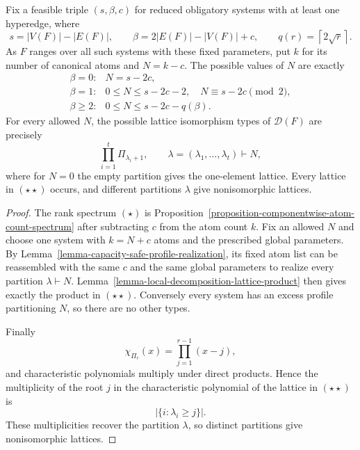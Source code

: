 \begin{corollary}
\label{corollary-factorization-lattice-spectrum}
Fix a feasible triple $(s,\beta,c)$ for reduced obligatory systems with at
least one hyperedge, where
\[
 s=|V(F)|-|E(F)|,
 \qquad
 \beta=2|E(F)|-|V(F)|+c,
 \qquad
 q(r)=\left\lceil2\sqrt r\right\rceil.
\]
As $F$ ranges over all such systems with these fixed parameters, put $k$ for
its number of canonical atoms and $N=k-c$.  The possible values of $N$ are
exactly
\[
\begin{array}{ll}
\beta=0:&N=s-2c,\\[1mm]
\beta=1:&0\le N\le s-2c-2,\quad N\equiv s-2c\pmod2,\\[1mm]
\beta\ge2:&0\le N\le s-2c-q(\beta).
\end{array}
\tag{\star}
\]
For every allowed $N$, the possible lattice isomorphism types of
$\mathcal D(F)$ are precisely
\[
 \prod_{i=1}^t\Pi_{\lambda_i+1},
 \qquad
 \lambda=(\lambda_1,\ldots,\lambda_t)\vdash N,
 \tag{\star\star}
\]
where for $N=0$ the empty partition gives the one-element lattice.  Every
lattice in \((\star\star)\) occurs, and different partitions $\lambda$ give
nonisomorphic lattices.
\end{corollary}
\begin{proof}
The rank spectrum \((\star)\) is
Proposition~\ref{proposition-componentwise-atom-count-spectrum} after
subtracting $c$ from the atom count $k$.  Fix an allowed $N$ and choose one
system with $k=N+c$ atoms and the prescribed global parameters.  By
Lemma~\ref{lemma-capacity-safe-profile-realization}, its fixed atom list can be
reassembled with the same $c$ and the same global parameters to realize every
partition $\lambda\vdash N$.  Lemma~\ref{lemma-local-decomposition-lattice-product}
then gives exactly the product in \((\star\star)\).  Conversely every system
has an excess profile partitioning $N$, so there are no other types.

Finally
\[
 \chi_{\Pi_{r}}(x)=\prod_{j=1}^{r-1}(x-j),
\]
and characteristic polynomials multiply under direct products.  Hence the
multiplicity of the root $j$ in the characteristic polynomial of the lattice
in \((\star\star)\) is
\[
 |\{i:\lambda_i\ge j\}|.
\]
These multiplicities recover the partition $\lambda$, so distinct partitions
give nonisomorphic lattices.
\end{proof}
